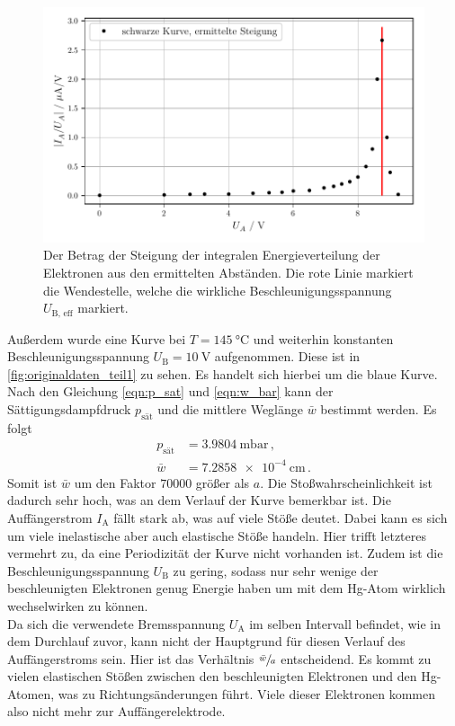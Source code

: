 \begin{figure}
    \centering
    \includegraphics[width=\textwidth]{bilder/ableitung.pdf}
    \caption{Der Betrag der Steigung der integralen Energieverteilung der Elektronen aus den ermittelten Abständen.
    Die rote Linie markiert die Wendestelle, welche die wirkliche Beschleunigungsspannung $U_\text{B, eff}$ markiert.}
    \label{fig:ableitung}
\end{figure}


\noindent
Außerdem wurde eine Kurve bei $T = \SI{145}{\celsius}$ und weiterhin konstanten Beschleunigungsspannung $U_\text{B} = \SI{10}{\volt}$ aufgenommen.
Diese ist in \autoref{fig:originaldaten_teil1} zu sehen. 
Es handelt sich hierbei um die blaue Kurve.
Nach den Gleichung \eqref{eqn:p_sat} und \eqref{eqn:w_bar} kann der Sättigungsdampfdruck $p_\text{sät}$ und die mittlere Weglänge $\bar{w}$ bestimmt werden.
Es folgt
\begin{align*}
    p_\text{sät} &= \SI{3.9804}{\milli\bar} \, , \\
    \bar{w} &= \SI{7.2858e-4}{\centi\metre} \, .
\end{align*}
Somit ist $\bar{w}$ um den Faktor $70000$ größer als $a$.
Die Stoßwahrscheinlichkeit ist dadurch sehr hoch, was an dem Verlauf der Kurve bemerkbar ist.
Die Auffängerstrom $I_\text{A}$ fällt stark ab, was auf viele Stöße deutet.
Dabei kann es sich um viele inelastische aber auch elastische Stöße handeln.
Hier trifft letzteres vermehrt zu, da eine Periodizität der Kurve nicht vorhanden ist.
Zudem ist die Beschleunigungsspannung $U_\text{B}$ zu gering, sodass nur sehr wenige der beschleunigten Elektronen genug Energie haben um mit dem Hg-Atom wirklich wechselwirken zu können.\\
\noindent
Da sich die verwendete Bremsspannung $U_\text{A}$ im selben Intervall befindet, wie in dem Durchlauf zuvor, kann nicht der Hauptgrund für diesen Verlauf des Auffängerstroms sein.
Hier ist das Verhältnis $\sfrac{\bar{w}}{a}$ entscheidend.
Es kommt zu vielen elastischen Stößen zwischen den beschleunigten Elektronen und den Hg-Atomen, was zu Richtungsänderungen führt.
Viele dieser Elektronen kommen also nicht mehr zur Auffängerelektrode.

